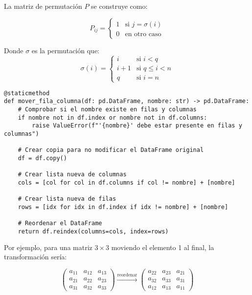 \documentclass[11pt,a4paper]{article}
\begin{document}
La matriz de permutación $P$ se construye como:

\begin{equation}
P_{ij} = \begin{cases}
1 & \text{si } j = \sigma(i) \\
0 & \text{en otro caso}
\end{cases}
\end{equation}

Donde $\sigma$ es la permutación que:
\begin{equation}
\sigma(i) = \begin{cases}
i & \text{si } i < q \\
i+1 & \text{si } q \leq i < n \\
q & \text{si } i = n
\end{cases}
\end{equation}

\begin{tcolorbox}[colback=codebackground,title=Implementación del Método]
\begin{lstlisting}
@staticmethod
def mover_fila_columna(df: pd.DataFrame, nombre: str) -> pd.DataFrame:
    # Comprobar si el nombre existe en filas y columnas
    if nombre not in df.index or nombre not in df.columns:
        raise ValueError(f"'{nombre}' debe estar presente en filas y columnas")
    
    # Crear copia para no modificar el DataFrame original        
    df = df.copy()
    
    # Crear lista nueva de columnas
    cols = [col for col in df.columns if col != nombre] + [nombre]
    
    # Crear lista nueva de filas
    rows = [idx for idx in df.index if idx != nombre] + [nombre]
    
    # Reordenar el DataFrame
    return df.reindex(columns=cols, index=rows)
\end{lstlisting}
\end{tcolorbox}

Por ejemplo, para una matriz $3 \times 3$ moviendo el elemento 1 al final, la transformación sería:

\begin{equation}
\begin{pmatrix}
a_{11} & a_{12} & a_{13} \\
a_{21} & a_{22} & a_{23} \\
a_{31} & a_{32} & a_{33}
\end{pmatrix} \xrightarrow{\text{reordenar}}
\begin{pmatrix}
a_{22} & a_{23} & a_{21} \\
a_{32} & a_{33} & a_{31} \\
a_{12} & a_{13} & a_{11}
\end{pmatrix}
\end{equation}
\end{document}
